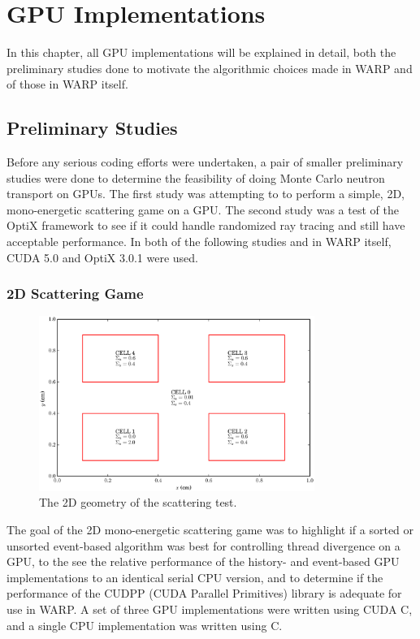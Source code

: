 \chapter{GPU Implementations}
\label{chap:imp}

In this chapter, all GPU implementations will be explained in detail, both the preliminary studies done to motivate the algorithmic choices made in WARP and of those in WARP itself.

\section{Preliminary Studies}
\label{sec:prelim}

Before any serious coding efforts were undertaken, a pair of smaller preliminary studies were done to determine the feasibility of doing Monte Carlo neutron transport on GPUs.  The first study was attempting to to perform a simple, 2D, mono-energetic scattering game on a GPU.  The second study was a test of the OptiX framework to see if it could handle randomized ray tracing and still have acceptable performance. In both of the following studies and in WARP itself, CUDA 5.0 and OptiX 3.0.1 were used.

\subsection{2D Scattering Game}

\begin{figure}[h!] 
  \centering
    \includegraphics[width=0.8\textwidth]{graphics/prelim_geom.eps}
     \caption{The 2D geometry of the scattering test. \label{prelim_geom} }
\end{figure}

The goal of the 2D mono-energetic scattering game was to highlight if a sorted or unsorted event-based algorithm was best for controlling thread divergence on a GPU, to the see the relative performance of the history- and event-based GPU implementations to an identical serial CPU version, and to determine if the performance of the CUDPP (CUDA Parallel Primitives) library is adequate for use in WARP.   A set of three GPU implementations were written using CUDA C, and a single CPU implementation was written using C.  

